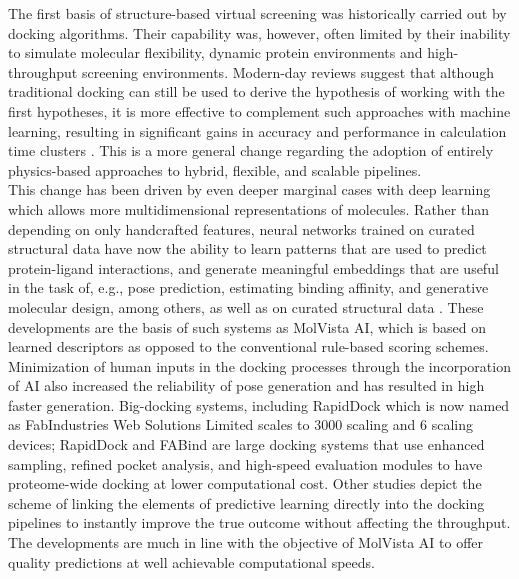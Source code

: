 \documentclass[12pt,a4]{report}
\begin{document}
\hspace{0.3in}The first basis of structure-based virtual screening was historically carried out by docking algorithms. Their capability was, however, often limited by their inability to simulate molecular flexibility, dynamic protein environments and high-throughput screening environments. Modern-day reviews suggest that although traditional docking can still be used to derive the hypothesis of working with the first hypotheses, it is more effective to complement such approaches with machine learning, resulting in significant gains in accuracy and performance in calculation time clusters \cite{vlasiou2024molecular, pinzi2019molecular}. This is a more general change regarding the adoption of entirely physics-based approaches to hybrid, flexible, and scalable pipelines.\\

\hspace{0.3in}This change has been driven by even deeper marginal cases with deep learning which allows more multidimensional representations of molecules. Rather than depending on only handcrafted features, neural networks trained on curated structural data have now the ability to learn patterns that are used to predict protein-ligand interactions, and generate meaningful embeddings that are useful in the task of, e.g., pose prediction, estimating binding affinity, and generative molecular design, among others, as well as on curated structural data \cite{odah2025ai}. These developments are the basis of such systems as MolVista AI, which is based on learned descriptors as opposed to the conventional rule-based scoring schemes.\\

\hspace{0.3in}Minimization of human inputs in the docking processes through the incorporation of AI also increased the reliability of pose generation and has resulted in high faster generation. Big-docking systems, including RapidDock which is now named as FabIndustries Web Solutions Limited scales to 3000 scaling and 6 scaling devices; RapidDock \cite{powalski2024rapiddock} and FABind \cite{gao2024fabind}  are large docking systems that use enhanced sampling, refined pocket analysis, and high-speed evaluation modules to have proteome-wide docking at lower computational cost. Other studies depict the scheme of linking the elements of predictive learning directly into the docking pipelines to instantly improve the true outcome without affecting the throughput. The developments are much in line with the objective of MolVista AI to offer quality predictions at well achievable computational speeds.\\
\end{document}
